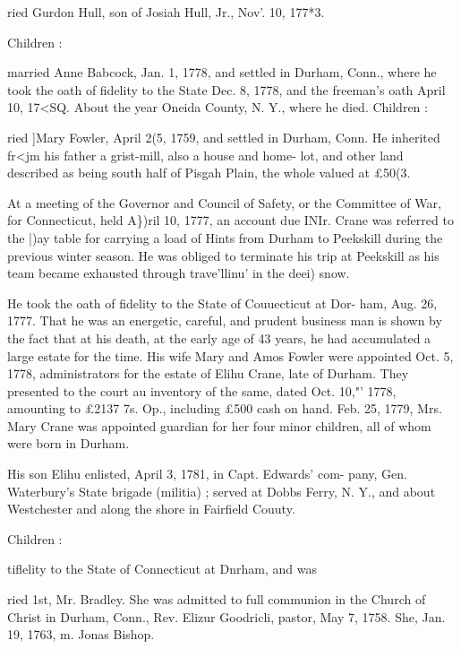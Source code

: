 \documentclass{book}
\begin{document}
ried Gurdon Hull, son of Josiah Hull, Jr., Nov'. 10, 177*3. 

Children : 


married Anne Babcock, Jan. 1, 1778, and settled in Durham, 
Conn., where he took the oath of fidelity to the State Dec. 8, 
1778, and the freeman's oath April 10, 17<SQ. About the year 
Oneida County, N. Y., where he died. Children : 









ried ]Mary Fowler, April 2(5, 1759, and settled in Durham, Conn. 
He inherited fr<jm his father a grist-mill, also a house and home- 
lot, and other land described as being south half of Pisgah Plain, 
the whole valued at £50(3. 

At a meeting of the Governor and Council of Safety, or the 
Committee of War, for Connecticut, held A\})ril 10, 1777, an 
account due INIr. Crane was referred to the |)ay table for carrying 
a load of Hints from Durham to Peekskill during the previous 
winter season. He was obliged to terminate his trip at Peekskill 
as his team became exhausted through trave'llinu' in the deei) snow. 




He took the oath of fidelity to the State of Couuecticut at Dor- 
ham, Aug. 26, 1777. That he was an energetic, careful, and 
prudent business man is shown by the fact that at his death, at 
the early age of 43 years, he had accumulated a large estate for 
the time. His wife Mary and Amos Fowler were appointed Oct. 
5, 1778, administrators for the estate of Elihu Crane, late of 
Durham. They presented to the court au inventory of the same, 
dated Oct. 10,"' 1778, amounting to £2137 7s. Op., including 
£500 cash on hand. Feb. 25, 1779, Mrs. Mary Crane was 
appointed guardian for her four minor children, all of whom were 
born in Durham. 

His son Elihu enlisted, April 3, 1781, in Capt. Edwards' com- 
pany, Gen. Waterbury's State brigade (militia) ; served at Dobbs 
Ferry, N. Y., and about Westchester and along the shore in 
Fairfield Couuty. 

Children : 


tiflelity to the State of Connecticut at Dnrham, and was 


ried 1st, Mr. Bradley. She was admitted to full communion in 
the Church of Christ in Durham, Conn., Rev. Elizur Goodricli, 
pastor, May 7, 1758. She, Jan. 19, 1763, m. Jonas Bishop. 
\end{document}
